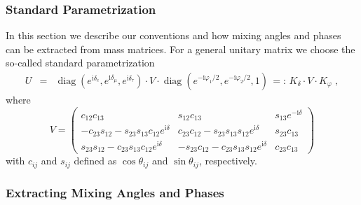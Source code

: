 \documentclass[12pt,a4paper,twoside]{scrartcl}
\DeclareMathOperator{\diag}{diag}
\def\I{\mathrm{i}}
\numberwithin{equation}{section}
\numberwithin{table}{section}
\begin{document}
\subsubsection{Standard Parametrization}
In this section we describe our conventions and how mixing angles and 
phases can be extracted from mass matrices.
For a general unitary matrix we choose the so-called 
standard parametrization
\begin{eqnarray}\label{eq:StandardParametrizationU}
 U & = &\diag(e^{\I\delta_{e}},e^{\I\delta_{\mu}},e^{\I\delta_{\tau}}) \cdot V \cdot 
 \diag(e^{-\I\varphi_1/2},e^{-\I\varphi_2/2},1)
 \,=:\,
 K_\delta\cdot V\cdot K_\varphi\;,
\end{eqnarray}
where 
\begin{equation}
 V=\left(
 \begin{array}{ccc}
 c_{12}c_{13} & s_{12}c_{13} & s_{13}e^{-\I\delta}\\
 -c_{23}s_{12}-s_{23}s_{13}c_{12}e^{\I\delta} &
 c_{23}c_{12}-s_{23}s_{13}s_{12}e^{\I\delta} & s_{23}c_{13}\\
 s_{23}s_{12}-c_{23}s_{13}c_{12}e^{\I\delta} &
 -s_{23}c_{12}-c_{23}s_{13}s_{12}e^{\I\delta} & c_{23}c_{13}
 \end{array}
 \right)
\end{equation}
with $c_{ij}$ and $s_{ij}$ defined as $\cos\theta_{ij}$ and
$\sin\theta_{ij}$, respectively. 


\subsubsection{Extracting Mixing Angles and Phases}
\label{sec:ExtractingMixingAngles}
\end{document}
